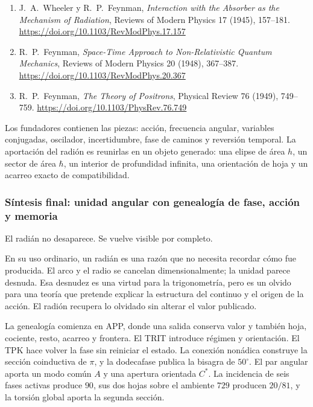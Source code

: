 \begin{enumerate}
\item\hypertarget{radionbib:WheelerFeynman1945}{}
J.~A.~Wheeler y R.~P.~Feynman,
\emph{Interaction with the Absorber as the Mechanism of Radiation},
Reviews of Modern Physics 17 (1945), 157--181.
\url{https://doi.org/10.1103/RevModPhys.17.157}

\item\hypertarget{radionbib:Feynman1948}{}
R.~P.~Feynman,
\emph{Space-Time Approach to Non-Relativistic Quantum Mechanics},
Reviews of Modern Physics 20 (1948), 367--387.
\url{https://doi.org/10.1103/RevModPhys.20.367}

\item\hypertarget{radionbib:Feynman1949}{}
R.~P.~Feynman,
\emph{The Theory of Positrons},
Physical Review 76 (1949), 749--759.
\url{https://doi.org/10.1103/PhysRev.76.749}
\end{enumerate}

\begin{narrativebox}
Los fundadores contienen las piezas: acción, frecuencia angular, variables
conjugadas, oscilador, incertidumbre, fase de caminos y reversión temporal.
La aportación del radión es reunirlas en un objeto generado: una elipse de
área \(h\), un sector de área \(\hbar\), un interior de profundidad infinita,
una orientación de hoja y un acarreo exacto de compatibilidad.
\end{narrativebox}
\subsubsection{Síntesis final: unidad angular con genealogía de fase, acción y memoria}

El radián no desaparece. Se vuelve visible por completo.

En su uso ordinario, un radián es una razón que no necesita recordar cómo fue
producida. El arco y el radio se cancelan dimensionalmente; la unidad parece
desnuda. Esa desnudez es una virtud para la trigonometría, pero es un olvido
para una teoría que pretende explicar la estructura del continuo y el origen
de la acción. El radión recupera lo olvidado sin alterar el valor publicado.

La genealogía comienza en APP, donde una salida conserva valor y también
hoja, cociente, resto, acarreo y frontera. El TRIT introduce régimen y
orientación. El TPK hace volver la fase sin reiniciar el estado. La conexión
nonádica construye la sección coinductiva de \(\pi\), y la dodecafase publica
la bisagra de \(50^\circ\). El par angular aporta un modo común \(A\) y una
apertura orientada \(C^*\). La incidencia de seis fases activas produce
\(90\), sus dos hojas sobre el ambiente \(729\) producen \(20/81\), y la
torsión global aporta la segunda sección.

